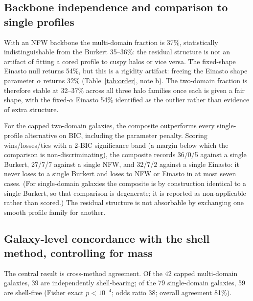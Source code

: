 \documentclass[twocolumn]{aastex701}
\begin{document}
\subsection{Backbone independence and comparison to single profiles}
\label{sec:backbone}

With an NFW backbone the multi-domain fraction is 37\%, statistically
indistinguishable from the Burkert 35--36\%: the residual structure is not an
artifact of fitting a cored profile to cuspy halos or vice versa. The
fixed-shape Einasto null returns 54\%, but this is a rigidity artifact:
freeing the Einasto shape parameter $\alpha$ returns 32\% (Table~\ref{tab:order},
note b). The two-domain fraction is therefore stable at 32--37\% across all
three halo families once each is given a fair shape, with the fixed-$\alpha$
Einasto 54\% identified as the outlier rather than evidence of extra structure.

For the capped two-domain galaxies, the composite outperforms every
single-profile alternative on BIC, including the parameter penalty. Scoring
wins/losses/ties with a 2-BIC significance band (a margin below which the
comparison is non-discriminating), the composite records 36/0/5 against a
single Burkert, 27/7/7 against a single NFW, and 32/7/2 against a single
Einasto: it never loses to a single Burkert and loses to NFW or Einasto in at
most seven cases. (For single-domain galaxies the composite is by
construction identical to a single Burkert, so that comparison is degenerate;
it is reported as non-applicable rather than scored.) The residual structure
is not absorbable by exchanging one smooth profile family for another.

\subsection{Galaxy-level concordance with the shell method, controlling for
mass} \label{sec:concordance}

The central result is cross-method agreement. Of the 42 capped multi-domain
galaxies, 39 are independently shell-bearing; of the 79 single-domain
galaxies, 59 are shell-free (Fisher exact $p < 10^{-4}$; odds ratio 38;
overall agreement 81\%).
\end{document}
